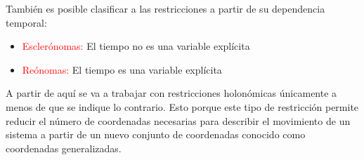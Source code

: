 \documentclass[/home/hernan-barquero/Documents/Apuntes_mecanica_teorica/main.tex]{subfiles}
\begin{document}
\begin{definition}
        También es posible clasificar a las restricciones a partir de su dependencia temporal:

        \begin{itemize}
            \item \textcolor{red}{Esclerónomas:} El tiempo no es una variable explícita
            \item \textcolor{red}{Reónomas:} El tiempo es una variable explícita
        \end{itemize}

    \end{definition}

    A partir de aquí se va a trabajar con restricciones holonómicas únicamente a menos de que se indique lo contrario. Esto porque este tipo de restricción permite reducir el número de coordenadas necesarias para describir el movimiento de un sistema a partir de un nuevo conjunto de coordenadas conocido como coordenadas generalizadas.
\end{document}
